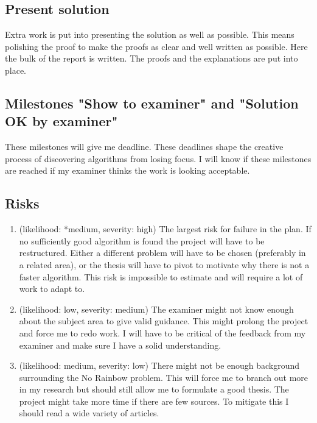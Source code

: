 \documentclass[msc,lith,english]{liuthesis}
\begin{document}
\subsection{Present solution}
Extra work is put into presenting the solution as well as possible.
This means polishing the proof to make the proofs as clear and well written as possible.
Here the bulk of the report is written. The proofs and the explanations are put into place.

\subsection{Milestones "Show to examiner" and "Solution OK by examiner"}
These milestones will give me deadline.
These deadlines shape the creative process of discovering algorithms from losing focus.
I will know if these milestones are reached if my examiner thinks the work is looking acceptable.

\subsection{Risks}

\begin{enumerate}
  \item (likelihood: *medium, severity: high)
    The largest risk for failure in the plan. If no sufficiently good algorithm
    is found the project will have to be restructured. Either a different problem
    will have to be chosen (preferably in a related area), or the thesis will have
    to pivot to motivate why there is not a faster algorithm. This risk is
    impossible to estimate and will require a lot of work to adapt to.

  \item (likelihood: low, severity: medium)
    The examiner might not know enough about the subject area to give valid
    guidance. This might prolong the project and force me to redo work. I will
    have to be critical of the feedback from my examiner and make sure I have a
    solid understanding.

  \item (likelihood: medium, severity: low)
    There might not be enough background surrounding the No Rainbow problem.
    This will force me to branch out more in my research but should still allow
    me to formulate a good thesis. The project might take more time if there
    are few sources. To mitigate this I should read a wide variety of articles.
\end{enumerate}
\end{document}
